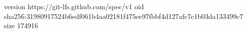 version https://git-lfs.github.com/spec/v1
oid sha256:31980917524b6edf061b4aa02181f475ee97fbbf4d127afc7c1b03da133499c7
size 174916
